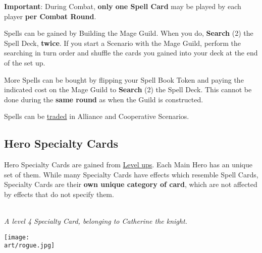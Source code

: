 \begin{multicols*}{2}
\textbf{Important}: During Combat, \textbf{only one Spell Card} may be played by each player \textbf{per Combat Round}.\par
Spells can be gained by Building the Mage Guild.
When you do, \textbf{Search} (2) the Spell Deck, \textbf{twice}.
If you start a Scenario with the Mage Guild, perform the searching in turn order and shuffle the cards you gained into your deck at the end of the set up.\par
More Spells can be bought by flipping your Spell Book Token and paying the indicated cost on the Mage Guild to \textbf{Search} (2) the Spell Deck.
This cannot be done during the \textbf{same round} as when the Guild is constructed.\par
Spells can be \hyperlink{Trading}{traded} in Alliance and Cooperative Scenarios.

\subsection*{\hypertarget{Specialty}{Hero Specialty Cards}}

Hero Specialty Cards are gained from \hyperlink{Level}{Level ups}.
Each Main Hero has an unique set of them.
While many Specialty Cards have effects which resemble Spell Cards, Specialty Cards are their \textbf{own unique category of card}, which are not affected by effects that do not specify them.

\begin{center}
  \\
  \medskip
  \scriptsize\textit{A level 4 Specialty Card, belonging to Catherine the knight.}
\end{center}

\vspace*{\fill}

\begin{center}
  \texttt{[image: \\art/rogue.jpg]}
\end{center}

\end{multicols*}
